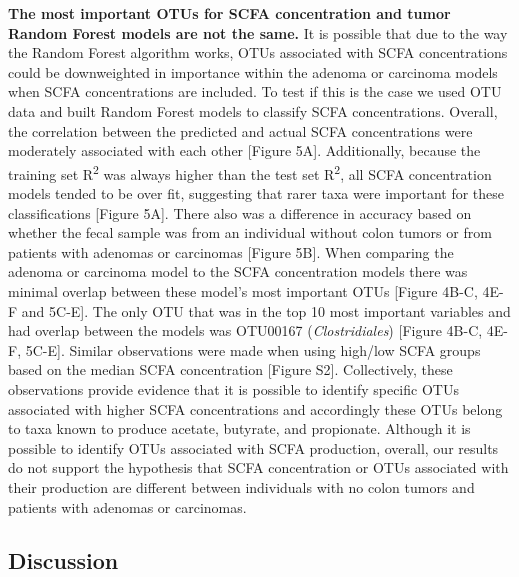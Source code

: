 \documentclass[11pt,]{article}
\begin{document}
\textbf{The most important OTUs for SCFA concentration and tumor Random
Forest models are not the same.} It is possible that due to the way the
Random Forest algorithm works, OTUs associated with SCFA concentrations
could be downweighted in importance within the adenoma or carcinoma
models when SCFA concentrations are included. To test if this is the
case we used OTU data and built Random Forest models to classify SCFA
concentrations. Overall, the correlation between the predicted and
actual SCFA concentrations were moderately associated with each other
{[}Figure 5A{]}. Additionally, because the training set
R\textsuperscript{2} was always higher than the test set
R\textsuperscript{2}, all SCFA concentration models tended to be over
fit, suggesting that rarer taxa were important for these classifications
{[}Figure 5A{]}. There also was a difference in accuracy based on
whether the fecal sample was from an individual without colon tumors or
from patients with adenomas or carcinomas {[}Figure 5B{]}. When
comparing the adenoma or carcinoma model to the SCFA concentration
models there was minimal overlap between these model's most important
OTUs {[}Figure 4B-C, 4E-F and 5C-E{]}. The only OTU that was in the top
10 most important variables and had overlap between the models was
OTU00167 (\emph{Clostridiales}) {[}Figure 4B-C, 4E-F, 5C-E{]}. Similar
observations were made when using high/low SCFA groups based on the
median SCFA concentration {[}Figure S2{]}. Collectively, these
observations provide evidence that it is possible to identify specific
OTUs associated with higher SCFA concentrations and accordingly these
OTUs belong to taxa known to produce acetate, butyrate, and propionate.
Although it is possible to identify OTUs associated with SCFA
production, overall, our results do not support the hypothesis that SCFA
concentration or OTUs associated with their production are different
between individuals with no colon tumors and patients with adenomas or
carcinomas.

\newpage

\subsection{Discussion}\label{discussion}
\end{document}
